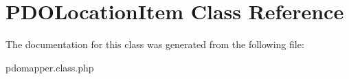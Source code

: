 \hypertarget{classPDOLocationItem}{
\section{PDOLocationItem Class Reference}
\label{classPDOLocationItem}
}


The documentation for this class was generated from the following file:\begin{DoxyCompactItemize}
\item 
pdomapper.class.php\end{DoxyCompactItemize}
